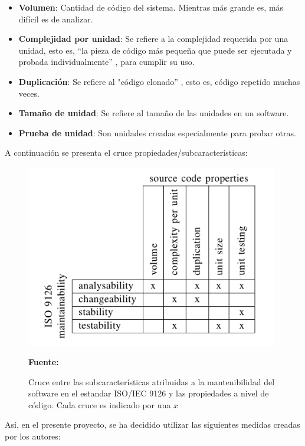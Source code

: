 \begin{itemize}
 \item \textbf{Volumen}: Cantidad de código del sistema. Mientras más grande es, más difícil es de analizar.
 \item \textbf{Complejidad por unidad}: Se refiere a la complejidad requerida por una unidad, esto es, “la pieza de código más pequeña que puede ser ejecutada y probada individualmente” \cite{measuring_maintainability}, para cumplir su uso.
 \item \textbf{Duplicación}: Se refiere al "código clonado” \cite{measuring_maintainability}, esto es, código repetido muchas veces.
 \item \textbf{Tamaño de unidad}: Se refiere al tamaño de las unidades en un software.
 \item \textbf{Prueba de unidad}: Son unidades creadas especialmente para probar otras.
\end{itemize}

A continuación se presenta el cruce propiedades/subcaracterísticas:

\begin{figure}[!htb]
  \begin{center}
    \includegraphics[width=11cm]{./imagenes/mantainability1.png}
    \caption{Cruce entre las subcaracterísticas atribuidas a la mantenibilidad del software en el estandar ISO/IEC 9126 y las propiedades a nivel de código. Cada cruce es indicado por una $x$}
    \label{fig:mantainability1}
    \textbf{Fuente:}  \cite{measuring_maintainability}
  \end{center}
\end{figure}

Así, en el presente proyecto, se ha decidido utilizar las siguientes medidas creadas por los autores:

